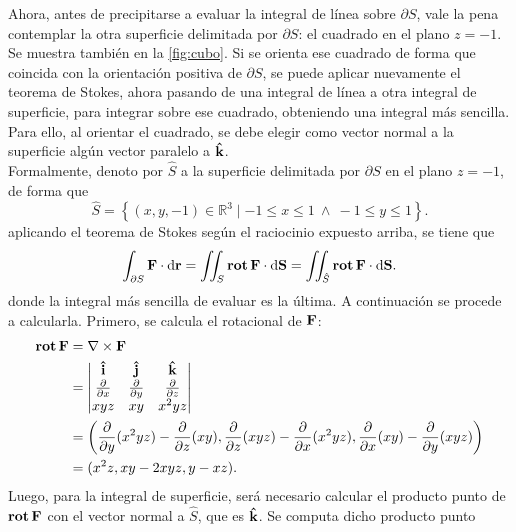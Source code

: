 \documentclass{fmbvecto}
\begin{document}
\begin{problema}
    Ahora, antes de precipitarse a evaluar la integral de línea sobre \(\partial S\), vale la pena contemplar la otra superficie delimitada por \(\partial S\): el cuadrado en el plano \(z = -1\). Se muestra también en la \ref{fig:cubo}. Si se orienta ese cuadrado de forma que coincida con la orientación positiva de \(\partial S\), se puede aplicar nuevamente el teorema de Stokes, ahora pasando de una integral de línea a otra integral de superficie, para integrar sobre ese cuadrado, obteniendo una integral más sencilla. Para ello, al orientar el cuadrado, se debe elegir como vector normal a la superficie algún vector paralelo a \(\uvec{k}\).\\
    
    Formalmente, denoto por \(\hat{S}\) a la superficie delimitada por \(\partial S\) en el plano \(z = -1\), de forma que
    \[
        \hat{S} = \left\{ (x, y, -1) \in \mathbb{R}^3 \mid -1 \leq x \leq 1 \ \land \ -1 \leq y \leq 1 \right\}.
    \]
    aplicando el teorema de Stokes según el raciocinio expuesto arriba, se tiene que
    \[
    \int_{\partial S} \boldsymbol{{\mathbf{F}}} \cdot \mathrm{d}\boldsymbol{{\mathbf{r}}} = \iint_S \operatorname{\mathbf{rot}} \boldsymbol{{\mathbf{F}}} \cdot \mathrm{d}\boldsymbol{{\mathbf{S}}} = \iint_{\hat{S}} \operatorname{\mathbf{rot}} \boldsymbol{{\mathbf{F}}} \cdot \mathrm{d}\boldsymbol{{\mathbf{S}}}.
    \]
    donde la integral más sencilla de evaluar es la última. A continuación se procede a calcularla. Primero, se calcula el rotacional de \(\boldsymbol{{\mathbf{F}}}\):
    \begin{align*}
        \rot \bvec{F} &= \nabla \times \bvec{F} \\
        &= \begin{vmatrix}
            \uvec{i} & \uvec{j} & \uvec{k} \\
            \frac{\partial}{\partial x} & \frac{\partial}{\partial y} & \frac{\partial}{\partial z} \\
            xyz & xy & x^2yz
        \end{vmatrix} \\
        &= \left( \frac{\partial}{\partial y} (x^2yz) - \frac{\partial}{\partial z} (xy), \frac{\partial}{\partial z} (xyz) - \frac{\partial}{\partial x} (x^2yz), \frac{\partial}{\partial x} (xy) - \frac{\partial}{\partial y} (xyz) \right) \\
        &= (x^2z, xy-2xyz, y-xz).
    \end{align*}
    Luego, para la integral de superficie, será necesario calcular el producto punto de \(\operatorname{\mathbf{rot}} \boldsymbol{{\mathbf{F}}}\) con el vector normal a \(\hat{S}\), que es \(\uvec{k}\). Se computa dicho producto punto
    \begin{align*}

\end{align*}
\end{problema}
\end{document}
